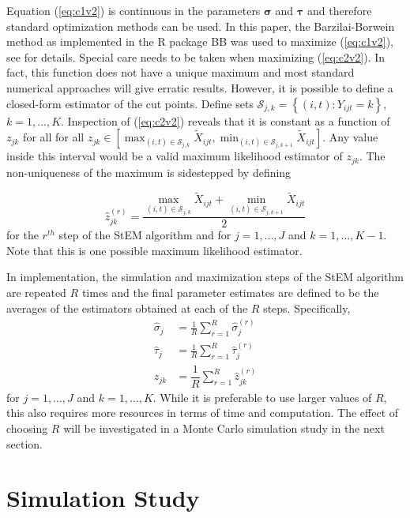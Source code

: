 \documentclass[12pt]{article}
\begin{document}
Equation (\ref{eq:c1v2}) is continuous in the parameters $\boldsymbol{\sigma}
$ and $\boldsymbol{\tau}$ and therefore standard optimization methods can be used. In this paper, the Barzilai-Borwein method as implemented in the R package BB was used to maximize (\ref{eq:c1v2}), see \cite{Varadhan09} for details. Special care needs to be taken when maximizing (\ref{eq:c2v2}). In fact, this function does not have a unique maximum and most standard numerical approaches will give
erratic results. However, it is possible to define a closed-form estimator of
the cut points. Define sets $\mathcal{S}_{j,k}=\left\{\left(i,t%
\right):Y_{ijt}=k\right\}$, $k=1,\ldots,K$. Inspection of (\ref{eq:c2v2})
reveals that it is constant as a function of $z_{jk}$ for all for all $%
z_{jk} \in \left[ \max_{(i,t) \in \mathcal{S}_{j,k}} \tilde{X}_{ijt},
\min_{(i,t) \in \mathcal{S}_{j,k+1}} \tilde{X}_{ijt} \right]$. Any value
inside this interval would be a valid maximum likelihood estimator of $z_{jk}
$. The non-uniqueness of the maximum is sidestepped by defining

\begin{equation*}
\hat{z}_{jk}^{(r)} = \frac{\max_{(i,t) \in \mathcal{S}_{j,k}} \tilde{X}%
_{ijt} + \min_{(i,t) \in \mathcal{S}_{j,k+1}} \tilde{X}_{ijt}}{2}
\label{zhat}
\end{equation*}
for the $r^{th}$ step of the StEM algorithm and for $j = 1, \ldots, J$ and $%
k = 1, \ldots, K-1$. Note that this is one possible maximum likelihood estimator.

In implementation, the simulation and maximization steps of the StEM
algorithm are repeated $R$ times and the final parameter estimates are
defined to be the averages of the estimators obtained at each of the $R$
steps. Specifically, 
\begin{align*}
\hat{\sigma}_j & = \frac{1}{R} \sum_{r=1}^R \hat{\sigma}_j^{(r)} \\
\hat{\tau}_j & = \frac{1}{R} \sum_{r=1}^R \hat{\tau}_j ^{(r)} \\
\hat{z}_{jk} & = \dfrac{1}{R} \sum_{r=1}^R \hat{z}_{jk}^{(r)}
\end{align*}
for $j = 1, \ldots, J$ and $k = 1, \ldots, K$. While it is preferable to use
larger values of $R$, this also requires more resources in terms of time and
computation. The effect of choosing $R$ will be investigated in a Monte
Carlo simulation study in the next section.

\section{Simulation Study}
\end{document}
